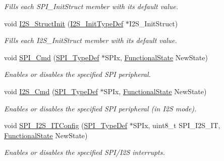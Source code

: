 \begin{DoxyCompactItemize}
\begin{DoxyCompactList}\small\item\em Fills each S\+P\+I\+\_\+\+Init\+Struct member with its default value. \end{DoxyCompactList}\item 
void \mbox{\hyperlink{group___s_p_i___private___functions_ga7470ec1d0759fdeeb42c7fe71a3b41b7}{I2\+S\+\_\+\+Struct\+Init}} (\mbox{\hyperlink{struct_i2_s___init_type_def}{I2\+S\+\_\+\+Init\+Type\+Def}} $\ast$I2\+S\+\_\+\+Init\+Struct)
\begin{DoxyCompactList}\small\item\em Fills each I2\+S\+\_\+\+Init\+Struct member with its default value. \end{DoxyCompactList}\item 
void \mbox{\hyperlink{group___s_p_i___private___functions_gaa31357879a65ee1ed7223f3b9114dcf3}{S\+P\+I\+\_\+\+Cmd}} (\mbox{\hyperlink{struct_s_p_i___type_def}{S\+P\+I\+\_\+\+Type\+Def}} $\ast$S\+P\+Ix, \mbox{\hyperlink{group___exported__types_gac9a7e9a35d2513ec15c3b537aaa4fba1}{Functional\+State}} New\+State)
\begin{DoxyCompactList}\small\item\em Enables or disables the specified S\+PI peripheral. \end{DoxyCompactList}\item 
void \mbox{\hyperlink{group___s_p_i___private___functions_gafe061c71bbc5b4224f3f2884dc53739e}{I2\+S\+\_\+\+Cmd}} (\mbox{\hyperlink{struct_s_p_i___type_def}{S\+P\+I\+\_\+\+Type\+Def}} $\ast$S\+P\+Ix, \mbox{\hyperlink{group___exported__types_gac9a7e9a35d2513ec15c3b537aaa4fba1}{Functional\+State}} New\+State)
\begin{DoxyCompactList}\small\item\em Enables or disables the specified S\+PI peripheral (in I2S mode). \end{DoxyCompactList}\item 
void \mbox{\hyperlink{group___s_p_i___private___functions_ga17f4ef132e8ddbf94cb6b1688d181e41}{S\+P\+I\+\_\+\+I2\+S\+\_\+\+I\+T\+Config}} (\mbox{\hyperlink{struct_s_p_i___type_def}{S\+P\+I\+\_\+\+Type\+Def}} $\ast$S\+P\+Ix, uint8\+\_\+t S\+P\+I\+\_\+\+I2\+S\+\_\+\+IT, \mbox{\hyperlink{group___exported__types_gac9a7e9a35d2513ec15c3b537aaa4fba1}{Functional\+State}} New\+State)
\begin{DoxyCompactList}\small\item\em Enables or disables the specified S\+P\+I/\+I2S interrupts. \end{DoxyCompactList}\item 

\end{DoxyCompactItemize}
